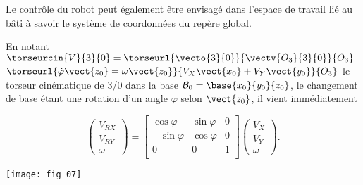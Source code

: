 \ifprof%
\begin{corrige}
\end{corrige}\else\fi

\ifprof%
\begin{corrige}
\end{corrige}\else\fi

Le contrôle du robot peut également être envisagé dans l'espace de travail lié au bâti à savoir le système de coordonnées du repère global.

En notant $\torseurcin{V}{3}{0}= \torseurl{\vecto{3}{0}}{\vectv{O_3}{3}{0}}{O_3}$ 
$\torseurl{\dot{\varphi}\vect{z_0}=\omega\vect{z_0}}{V_X\vect{x_0}+V_Y\vect{y_0}}{O_3}$ 
le torseur cinématique de 3/0 dans la base $\mathcal{B}_0=\base{x_0}{y_0}{z_0}$,
le changement de base étant une rotation d'un angle $\varphi$ selon $\vect{z_0}$, il vient immédiatement

$$
\begin{pmatrix} V_{RX} \\ V_{RY} \\ \omega \end{pmatrix}
=
\begin{bmatrix}  
\cos \varphi  &  \sin \varphi & 0 \\
- \sin \varphi & \cos \varphi & 0 \\
0 &  0 & 1 \\
\end{bmatrix}
\begin{pmatrix}
V_X \\ V_Y \\ \omega
\end{pmatrix}.
$$

\ifprof%
\begin{corrige}
\end{corrige}\else\fi

\begin{center}
\texttt{[image: fig\_07]}
\end{center}

